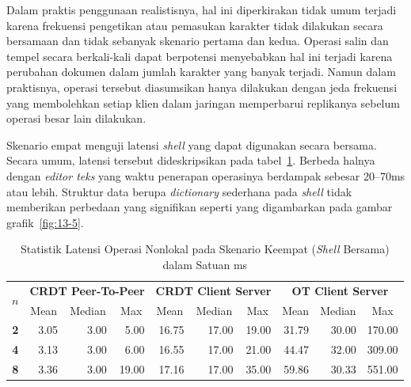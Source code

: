 Dalam praktis penggunaan realistisnya, hal ini diperkirakan tidak umum terjadi karena frekuensi pengetikan atau pemasukan karakter tidak dilakukan secara bersamaan dan tidak sebanyak skenario pertama dan kedua. Operasi salin dan tempel secara berkali-kali dapat berpotensi menyebabkan hal ini terjadi karena perubahan dokumen dalam jumlah karakter yang banyak terjadi. Namun dalam praktisnya, operasi tersebut diasumsikan hanya dilakukan dengan jeda frekuensi yang membolehkan setiap klien dalam jaringan memperbarui replikanya sebelum operasi besar lain dilakukan.

Skenario empat menguji latensi \textit{shell} yang dapat digunakan secara bersama. Secara umum, latensi tersebut dideskripsikan pada tabel~\ref{tab:latency-4}. Berbeda halnya dengan \textit{editor teks} yang waktu penerapan operasinya berdampak sebesar 20--70ms atau lebih. Struktur data berupa \textit{dictionary} sederhana pada \textit{shell} tidak memberikan perbedaan yang signifikan seperti yang digambarkan pada gambar grafik~\ref{fig:13-5}.

\begin{table}[H]
 \centering
\begin{tabular}{|c|rrr|rrr|rrr|}
\hline
\multirow{2}{*}{$n$} & \multicolumn{3}{c|}{\textbf{CRDT Peer-To-Peer}} & \multicolumn{3}{c|}{\textbf{CRDT Client Server}} & \multicolumn{3}{c|}{\textbf{OT Client Server}} \\ \cline{2-10}
 & \multicolumn{1}{c|}{Mean} & \multicolumn{1}{c|}{Median} & \multicolumn{1}{c|}{Max} & \multicolumn{1}{c|}{Mean} & \multicolumn{1}{c|}{Median} & \multicolumn{1}{c|}{Max} & \multicolumn{1}{c|}{Mean} & \multicolumn{1}{c|}{Median} & \multicolumn{1}{c|}{Max} \\ \hline
\textbf{2} & \multicolumn{1}{r|}{3.05} & \multicolumn{1}{r|}{3.00} & 5.00 & \multicolumn{1}{r|}{16.75} & \multicolumn{1}{r|}{17.00} & 19.00 & \multicolumn{1}{r|}{31.79} & \multicolumn{1}{r|}{30.00} & 170.00 \\ \hline
\textbf{4} & \multicolumn{1}{r|}{3.13} & \multicolumn{1}{r|}{3.00} & 6.00 & \multicolumn{1}{r|}{16.55} & \multicolumn{1}{r|}{17.00} & 21.00 & \multicolumn{1}{r|}{44.47} & \multicolumn{1}{r|}{32.00} & 309.00 \\ \hline
\textbf{8} & \multicolumn{1}{r|}{3.36} & \multicolumn{1}{r|}{3.00} & 19.00 & \multicolumn{1}{r|}{17.16} & \multicolumn{1}{r|}{17.00} & 35.00 & \multicolumn{1}{r|}{59.86} & \multicolumn{1}{r|}{30.33} & 551.00 \\ \hline
\end{tabular}
 \caption{Statistik Latensi Operasi Nonlokal pada Skenario Keempat (\textit{Shell} Bersama) dalam Satuan ms}
 \label{tab:latency-4}
\end{table}

